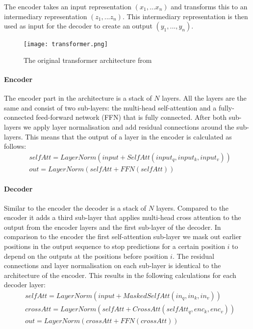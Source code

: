 The encoder takes an input representation $(x_1,...x_n)$ and transforms this to an intermediary representation $(z_1,...z_n)$. This intermediary representation is then used as input for the decoder to create an output $(y_1,...,y_n)$.

\begin{figure}[ht]
\caption{The original transformer architecture from \cite{vaswani_attention_2017}}
\centering
\texttt{[image: transformer.png]}
\label{fig:prelim:transformer-architecture}
\end{figure}

\paragraph{Encoder}
The encoder part in the architecture is a stack of $N$ layers. All the layers are the same and consist of two sub-layers: the multi-head self-attention and a fully-connected feed-forward network (FFN) that is fully connected. After both sub-layers we apply layer normalisation\cite{ba_layer_2016} and add residual connections\cite{he_deep_2015} around the sub-layers. This means that the output of a layer in the encoder is calculated as follows: 
\begin{align}
\label{par:prelim:transformer-encoder}
&selfAtt = LayerNorm(input + SelfAtt(input_q, input_k, input_v))\\
&out = LayerNorm(selfAtt + FFN(selfAtt))
\end{align}


\paragraph{Decoder}
Similar to the encoder the decoder is a stack of $N$ layers. Compared to the encoder it adds a third sub-layer that applies multi-head cross attention to the output from the encoder layers and the first sub-layer of the decoder. In comparison to the encoder the first self-attention sub-layer we mask out earlier positions in the output sequence to stop predictions for a certain position $i$ to depend on the outputs at the positions before position $i$. The residual connections and layer normalisation on each sub-layer is identical to the architecture of the encoder. This results in the following calculations for each decoder layer: 
\begin{align}
&selfAtt = LayerNorm(input + MaskedSelfAtt(in_q, in_k, in_v))\\
&crossAtt = LayerNorm(selfAtt + CrossAtt(selfAtt_q, enc_k, enc_v))\\
&out = LayerNorm(crossAtt + FFN(crossAtt))
\end{align}

